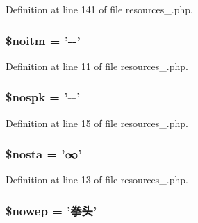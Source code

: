 Definition at line 141 of file resources\+\_.\+php.

\hypertarget{resources__1_8php_ad51c71e4cc6cd78c709454b5f2a2f84c}{
\subsubsection[{\$noitm}]{\setlength{\rightskip}{0pt plus 5cm}\$noitm = '-\/-\/'}}\label{resources__1_8php_ad51c71e4cc6cd78c709454b5f2a2f84c}


Definition at line 11 of file resources\+\_.\+php.

\hypertarget{resources__1_8php_a472cdfe07d9d5ca35696f2aa6848fd0c}{
\subsubsection[{\$nospk}]{\setlength{\rightskip}{0pt plus 5cm}\$nospk = '-\/-\/'}}\label{resources__1_8php_a472cdfe07d9d5ca35696f2aa6848fd0c}


Definition at line 15 of file resources\+\_.\+php.

\hypertarget{resources__1_8php_a1b178dce2c8c7c1f35b20c828d51de4a}{
\subsubsection[{\$nosta}]{\setlength{\rightskip}{0pt plus 5cm}\$nosta = '∞'}}\label{resources__1_8php_a1b178dce2c8c7c1f35b20c828d51de4a}


Definition at line 13 of file resources\+\_.\+php.

\hypertarget{resources__1_8php_a413d4ee11837afa83d33b1cd34244911}{
\subsubsection[{\$nowep}]{\setlength{\rightskip}{0pt plus 5cm}\$nowep = '拳头'}}\label{resources__1_8php_a413d4ee11837afa83d33b1cd34244911}


